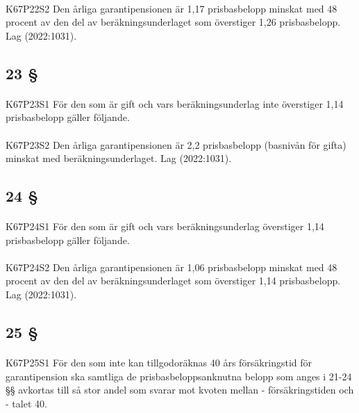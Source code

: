 \documentclass[a4paper,notitlepage,openany,10pt]{book}
\begin{document}
\paragraph*{}
{\tiny K67P22S2}
Den årliga garantipensionen är 1,17 prisbasbelopp minskat med 48 procent av den del av beräkningsunderlaget som överstiger 1,26 prisbasbelopp.
Lag (2022:1031).
\subsection*{23 §}
\paragraph*{}
{\tiny K67P23S1}
För den som är gift och vars beräkningsunderlag inte överstiger 1,14 prisbasbelopp gäller följande.
\paragraph*{}
{\tiny K67P23S2}
Den årliga garantipensionen är 2,2 prisbasbelopp (basnivån för gifta) minskat med beräkningsunderlaget.
Lag (2022:1031).
\subsection*{24 §}
\paragraph*{}
{\tiny K67P24S1}
För den som är gift och vars beräkningsunderlag överstiger 1,14 prisbasbelopp gäller följande.
\paragraph*{}
{\tiny K67P24S2}
Den årliga garantipensionen är 1,06 prisbasbelopp minskat med 48 procent av den del av beräkningsunderlaget som överstiger 1,14 prisbasbelopp.
Lag (2022:1031).
\subsection*{25 §}
\paragraph*{}
{\tiny K67P25S1}
För den som inte kan tillgodoräknas 40 års försäkringstid för garantipension ska samtliga de prisbasbeloppsanknutna belopp som anges i 21-24 §§ avkortas till så stor andel som svarar mot kvoten mellan
\newline - försäkringstiden och
\newline - talet 40.
\end{document}
